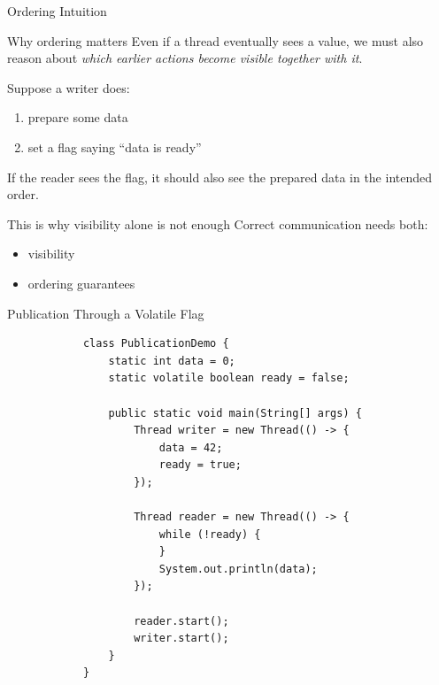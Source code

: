 \documentclass[aspectratio=169,11pt]{beamer}
\begin{document}
	\begin{frame}{Ordering Intuition}
		\begin{block}{Why ordering matters}
			Even if a thread eventually sees a value, we must also reason about \emph{which earlier actions become visible together with it}.
		\end{block}
		
		\vspace{0.3cm}
		
		Suppose a writer does:
		\begin{enumerate}
			\item prepare some data
			\item set a flag saying ``data is ready''
		\end{enumerate}
		
		If the reader sees the flag, it should also see the prepared data in the intended order.
		
		\vspace{0.3cm}
		
		\begin{alertblock}{This is why visibility alone is not enough}
			Correct communication needs both:
			\begin{itemize}
				\item visibility
				\item ordering guarantees
			\end{itemize}
		\end{alertblock}
	\end{frame}
	
	\begin{frame}[fragile]{Publication Through a Volatile Flag}
		\begin{lstlisting}
			class PublicationDemo {
				static int data = 0;
				static volatile boolean ready = false;
				
				public static void main(String[] args) {
					Thread writer = new Thread(() -> {
						data = 42;
						ready = true;
					});
					
					Thread reader = new Thread(() -> {
						while (!ready) {
						}
						System.out.println(data);
					});
					
					reader.start();
					writer.start();
				}
			}
		\end{lstlisting}
	\end{frame}
	
\end{document}
